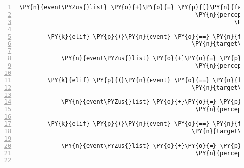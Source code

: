 \begin{Verbatim}[commandchars=\\\{\},numbers=left,firstnumber=1,stepnumber=1]
            \PY{n}{event\PYZus{}list} \PY{o}{+}\PY{o}{=} \PY{p}{[}\PY{n}{fabula}\PY{o}{.}\PY{n}{PerceptionEvent}\PY{p}{(}\PY{n}{identifier}\PY{o}{=}\PY{n}{ID\PYZus{}CASSANDRA}\PY{p}{,}
                                                  \PY{n}{perception}\PY{o}{=}\PY{l+s}{\PYZsq{}}\PY{l+s}{Oh, ein Stückchen Kuchen, sieht das gut aus! }\PY{l+s}{\PYZsq{}}
                                                             \PY{l+s}{\PYZsq{}}\PY{l+s}{Aber ich bin ja auf Diät.}\PY{l+s}{\PYZsq{}}\PY{p}{)}\PY{p}{]}

        \PY{k}{elif} \PY{p}{(}\PY{n}{event} \PY{o}{==} \PY{n}{fabula}\PY{o}{.}\PY{n}{TriesToLookAtEvent}\PY{p}{(}\PY{n}{identifier}\PY{o}{=}\PY{n}{ID\PYZus{}CASSANDRA}\PY{p}{,}
                                                 \PY{n}{target\PYZus{}identifier}\PY{o}{=}\PY{l+s}{\PYZsq{}}\PY{l+s}{lute\PYZus{}broken}\PY{l+s}{\PYZsq{}}\PY{p}{)}\PY{p}{)}\PY{p}{:}

            \PY{n}{event\PYZus{}list} \PY{o}{+}\PY{o}{=} \PY{p}{[}\PY{n}{fabula}\PY{o}{.}\PY{n}{PerceptionEvent}\PY{p}{(}\PY{n}{identifier}\PY{o}{=}\PY{n}{ID\PYZus{}CASSANDRA}\PY{p}{,}
                                                  \PY{n}{perception}\PY{o}{=}\PY{l+s}{\PYZsq{}}\PY{l+s}{Ein wirklich schönes Instrument, leider fehlen ihre Saiten}\PY{l+s}{\PYZsq{}}\PY{p}{)}\PY{p}{]}

        \PY{k}{elif} \PY{p}{(}\PY{n}{event} \PY{o}{==} \PY{n}{fabula}\PY{o}{.}\PY{n}{TriesToLookAtEvent}\PY{p}{(}\PY{n}{identifier}\PY{o}{=}\PY{n}{ID\PYZus{}CASSANDRA}\PY{p}{,}
                                                 \PY{n}{target\PYZus{}identifier}\PY{o}{=}\PY{l+s}{\PYZsq{}}\PY{l+s}{lute}\PY{l+s}{\PYZsq{}}\PY{p}{)}\PY{p}{)}\PY{p}{:}

            \PY{n}{event\PYZus{}list} \PY{o}{+}\PY{o}{=} \PY{p}{[}\PY{n}{fabula}\PY{o}{.}\PY{n}{PerceptionEvent}\PY{p}{(}\PY{n}{identifier}\PY{o}{=}\PY{n}{ID\PYZus{}CASSANDRA}\PY{p}{,}
                                                  \PY{n}{perception}\PY{o}{=}\PY{l+s}{\PYZsq{}}\PY{l+s}{Eine wohlklingende Laute!}\PY{l+s}{\PYZsq{}}\PY{p}{)}\PY{p}{]}

        \PY{k}{elif} \PY{p}{(}\PY{n}{event} \PY{o}{==} \PY{n}{fabula}\PY{o}{.}\PY{n}{TriesToLookAtEvent}\PY{p}{(}\PY{n}{identifier}\PY{o}{=}\PY{n}{ID\PYZus{}KUNI}\PY{p}{,}
                                                 \PY{n}{target\PYZus{}identifier}\PY{o}{=}\PY{l+s}{\PYZsq{}}\PY{l+s}{goblet\PYZus{}filled}\PY{l+s}{\PYZsq{}}\PY{p}{)}\PY{p}{)}\PY{p}{:}

            \PY{n}{event\PYZus{}list} \PY{o}{+}\PY{o}{=} \PY{p}{[}\PY{n}{fabula}\PY{o}{.}\PY{n}{PerceptionEvent}\PY{p}{(}\PY{n}{identifier}\PY{o}{=}\PY{n}{ID\PYZus{}KUNI}\PY{p}{,}
                                                  \PY{n}{perception}\PY{o}{=}\PY{l+s}{\PYZsq{}}\PY{l+s}{Ein mit Tau gefüllter Blütenkelch.}\PY{l+s}{\PYZsq{}}\PY{p}{)}\PY{p}{]}


\end{Verbatim}
